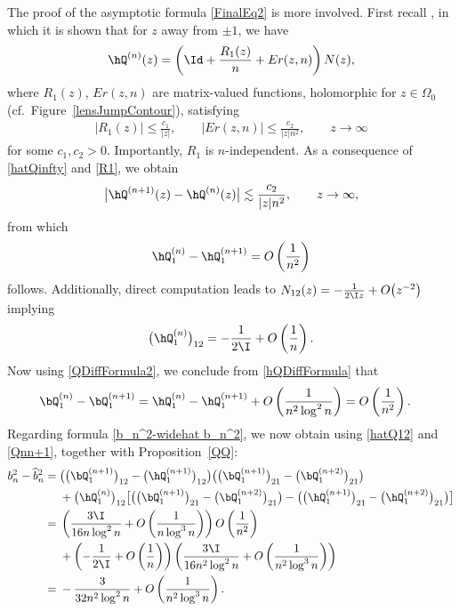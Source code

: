 The proof of the asymptotic formula \eqref{FinalEq2} is more involved. First recall \cite[Section~8]{KMVV}, in which it is shown that for $z$ away from $\pm 1$, we have
\begin{align} \label{hatQinfty}
 \hQ^{(n)}(z) = \left(\Id + \frac{R_1(z)}{n} + Er(z,n)\right)N(z),
\end{align}
where $R_1(z)$, $Er(z,n)$ are matrix-valued functions, holomorphic for $z \in \Omega_0$ (cf.\ Figure~\ref{lensJumpContour}), satisfying
\begin{align}\label{R1}
 |R_1(z)| \leq \frac{c_1}{|z|}, \qquad |Er(z,n)| \leq \frac{c_2}{|z|n^2}, \qquad z \to \infty
\end{align}
for some $c_1, c_2 > 0$. Importantly, $R_1$ is $n$-independent. As a consequence of \eqref{hatQinfty} and \eqref{R1}, we obtain
\begin{align*}
 \big|\hQ^{(n+1)}(z) - \hQ^{(n)}(z)\big| \lesssim \frac{c_2}{|z|n^2}, \qquad z\to \infty,
\end{align*}
from which
\begin{align}\label{hQDiffFormula}
 \hQ^{(n)}_1 - \hQ^{(n+1)}_1 = O\left(\frac{1}{n^2}\right)
\end{align}
follows. Additionally, direct computation leads to $N_{12}(z) = -\frac{1}{2\I z} + O\big(z^{-2}\big)$ implying
\begin{align}\label{hatQ12}
 \big(\hQ^{(n)}_1\big)_{12} = -\frac{1}{2\I} + O\left(\frac{1}{n}\right).
\end{align}
Now using \eqref{QDiffFormula2}, we conclude from \eqref{hQDiffFormula} that
\begin{align}
 \bQ^{(n)}_1 - \bQ^{(n+1)}_1 &= \hQ^{(n)}_1 - \hQ^{(n+1)}_1 + O\left(\frac{1}{n^2\log^2 n}\right)= O\left(\frac{1}{n^2}\right).\label{Qnn+1}
\end{align}
Regarding formula \eqref{b_n^2-widehat b_n^2}, we now obtain using \eqref{hatQ12} and \eqref{Qnn+1}, together with Proposition~\ref{QQ}:
\begin{align}\nonumber
 b_n^2-\widehat b_n^2={}& \big(\big(\bQ_1^{(n+1)}\big)_{12}-\big(\hQ_1^{(n+1)}\big)_{12}\big)\big(\big(\bQ_1^{(n+1)}\big)_{21}-\big(\bQ_1^{(n+2)}\big)_{21}\big)
 \\\nonumber
 &+ \big( \hQ_1^{(n)}\big)_{12}\big[\big(\big(\bQ_1^{(n+1)}\big)_{21}-\big(\bQ_1^{(n+2)}\big)_{21}\big)-\big(\big(\hQ_1^{(n+1)}\big)_{21}-\big(\hQ_1^{(n+2)}\big)_{21}\big)\big]\nonumber
 \\
={}& \left(\frac{3\I}{16n\log^2 n} + O\left(\frac{1}{n\log^3 n}\right)\right)O\left(\frac{1}{n^2}\right)\nonumber
 \\
 &+\left(-\frac{1}{2\I}+O\left(\frac{1}{n}\right)\right) \left(\frac{3\I}{16n^2\log^2 n} + O\left(\frac{1}{n^2\log^3 n}\right)\right)\nonumber
 \\
={}& -\frac{3}{32n^2\log^2 n} + O\left(\frac{1}{n^2\log^3 n}\right).\label{bnlong}
\end{align}
